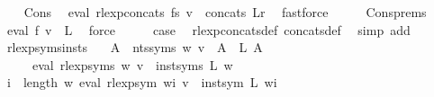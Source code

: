 \begin{isabellebody}
\ \ \isamarkupfalse%
\ Cons\ \isamarkupfalse%
\ {\isachardoublequoteopen}eval\ {\isacharparenleft}{\kern0pt}rlexp{\isacharunderscore}{\kern0pt}concats\ fs{\isacharparenright}{\kern0pt}\ v\ {\isacharequal}{\kern0pt}\ concats\ Lr{\isachardoublequoteclose}\ \isamarkupfalse%
\ fastforce\isanewline
\ \ \isamarkupfalse%
\ \isamarkupfalse%
\ Cons{\isachardot}{\kern0pt}prems\ {\isacharasterisk}{\kern0pt}\ \isamarkupfalse%
\ {\isachardoublequoteopen}eval\ f{}\ v\ {\isacharequal}{\kern0pt}\ L{}{\isachardoublequoteclose}\ \isamarkupfalse%
\ force\isanewline
\ \ \isamarkupfalse%
\ \isamarkupfalse%
\ {\isacharquery}{\kern0pt}case\ \isamarkupfalse%
\ rlexp{\isacharunderscore}{\kern0pt}concats{\isacharunderscore}{\kern0pt}def\ concats{\isacharunderscore}{\kern0pt}def\ \isamarkupfalse%
\ {\isacharparenleft}{\kern0pt}simp\ add{\isacharcolon}{\kern0pt}\ {\isachardoublequoteopen}{\isacharasterisk}{\kern0pt}{\isachardoublequoteclose}{\isacharparenright}{\kern0pt}\isanewline
{}\isamarkupfalse%
%
\endisatagproof
{\isafoldproof}%
%
\isadelimproof
\isanewline
%
\endisadelimproof
\isanewline
{}\isamarkupfalse%
\ rlexp{\isacharunderscore}{\kern0pt}syms{\isacharunderscore}{\kern0pt}insts{\isacharcolon}{\kern0pt}\isanewline
\ \ \ {\isachardoublequoteopen}{\isasymforall}A\ {\isasymin}\ nts{\isacharunderscore}{\kern0pt}syms\ w{\isachardot}{\kern0pt}\ v\ {\isacharparenleft}{\kern0pt}{\isasymgamma}{\isacharprime}{\kern0pt}\ A{\isacharparenright}{\kern0pt}\ {\isacharequal}{\kern0pt}\ L\ A{\isachardoublequoteclose}\isanewline
\ \ \ \ \ {\isachardoublequoteopen}eval\ {\isacharparenleft}{\kern0pt}rlexp{\isacharunderscore}{\kern0pt}syms\ w{\isacharparenright}{\kern0pt}\ v\ {\isacharequal}{\kern0pt}\ inst{\isacharunderscore}{\kern0pt}syms\ L\ w{\isachardoublequoteclose}\isanewline
%
\isadelimproof
%
\endisadelimproof
%
\isatagproof
{}\isamarkupfalse%
\ {\isacharminus}{\kern0pt}\isanewline
\ \ \isamarkupfalse%
\ {\isachardoublequoteopen}{\isasymforall}i\ {\isacharless}{\kern0pt}\ length\ w{\isachardot}{\kern0pt}\ eval\ {\isacharparenleft}{\kern0pt}rlexp{\isacharunderscore}{\kern0pt}sym\ {\isacharparenleft}{\kern0pt}w{\isacharbang}{\kern0pt}i{\isacharparenright}{\kern0pt}{\isacharparenright}{\kern0pt}\ v\ {\isacharequal}{\kern0pt}\ inst{\isacharunderscore}{\kern0pt}sym\ L\ {\isacharparenleft}{\kern0pt}w{\isacharbang}{\kern0pt}i{\isacharparenright}{\kern0pt}{\isachardoublequoteclose}\isanewline

\end{isabellebody}
